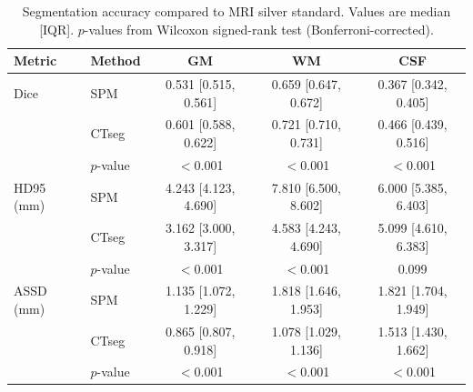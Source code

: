 \begin{table}[t]
\centering
\caption{Segmentation accuracy compared to MRI silver standard. Values are median [IQR]. $p$-values from Wilcoxon signed-rank test (Bonferroni-corrected).}
\label{tab:segmentation}
\small
\begin{tabular}{llccc}
\toprule
Metric & Method & GM & WM & CSF \\
\midrule
Dice & SPM & 0.531 [0.515, 0.561] & 0.659 [0.647, 0.672] & 0.367 [0.342, 0.405] \\
 & CTseg & 0.601 [0.588, 0.622] & 0.721 [0.710, 0.731] & 0.466 [0.439, 0.516] \\
 & $p$-value & $<$0.001 & $<$0.001 & $<$0.001 \\
\midrule
HD95 (mm) & SPM & 4.243 [4.123, 4.690] & 7.810 [6.500, 8.602] & 6.000 [5.385, 6.403] \\
 & CTseg & 3.162 [3.000, 3.317] & 4.583 [4.243, 4.690] & 5.099 [4.610, 6.383] \\
 & $p$-value & $<$0.001 & $<$0.001 & 0.099 \\
\midrule
ASSD (mm) & SPM & 1.135 [1.072, 1.229] & 1.818 [1.646, 1.953] & 1.821 [1.704, 1.949] \\
 & CTseg & 0.865 [0.807, 0.918] & 1.078 [1.029, 1.136] & 1.513 [1.430, 1.662] \\
 & $p$-value & $<$0.001 & $<$0.001 & $<$0.001 \\
\bottomrule
\end{tabular}
\end{table}
